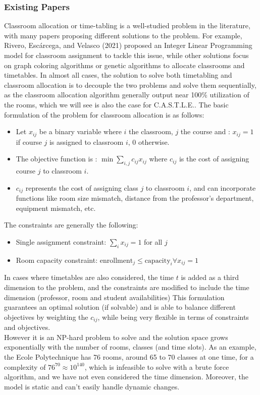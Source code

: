 \documentclass[a4paper, oneside]{article}
\newcommand{\castle}{C{\small.}A{\small.}S{\small.}T{\small.}L{\small.}E{\small.}}
\begin{document}
\subsubsection{Existing Papers}
Classroom allocation or time-tabling is a well-studied problem in the literature, with many papers proposing different solutions to the problem.
For example, Rivero, Escárcega, and Velasco (2021) proposed an Integer Linear Programming model for classroom assignment to tackle this issue, while other solutions
focus on graph coloring algorithms or genetic algorithms to allocate classrooms and timetables. In almost all cases, the solution to solve both
timetabling and classroom allocation is to decouple the two problems and solve them sequentially, as the classroom allocation algorithm generally output near 100\% utilization of the rooms,
which we will see is also the case for \castle{}.
The basic formulation of the problem for classroom allocation is as follows:
\begin{itemize}
	\item Let $x_{ij}$ be a binary variable where $i$ the classroom, $j$ the course and : $x_{ij} = 1$ if course $j$ is assigned to classroom $i$, $0$ otherwise.
	\item The objective function is : $\min \sum_{i,j} c_{ij}x_{ij}$ where $c_{ij}$ is the cost of assigning course $j$ to classroom $i$.
	\item $c_{ij}$ represents the cost of assigning class $j$ to classroom $i$, and can incorporate functions like room size mismatch, distance from the professor's department, equipment mismatch, etc.
\end{itemize}
The constraints are generally the following:
\begin{itemize}
	\item Single assignment constraint: $\sum_{i} x_{ij} = 1$ for all $j$
	\item Room capacity constraint: $\text{enrollment}_j \leq \text{capacity}_i \forall x_{ij} = 1$
\end{itemize}
In cases where timetables are also considered, the time $t$ is added as a third dimension to the problem, and the constraints are modified to include the time dimension (professor, room and student availabilities)
This formulation guarantees an optimal solution (if solvable) and is able to balance different objectives by weighting the $c_{ij}$, while being very flexible in terms of constraints and objectives.\\

However it is an NP-hard problem to solve and the solution space grows exponentially with the number of rooms, classes (and time slots). As an example, the Ecole Polytechnique has 76 rooms, around 65 to 70 classes at one time, for a complexity of $76^{70} \approx 10^{140}$, which is infeasible to solve with a brute force algorithm,
and we have not even considered the time dimension. Moreover, the model is static and can't easily handle dynamic changes.
\end{document}
